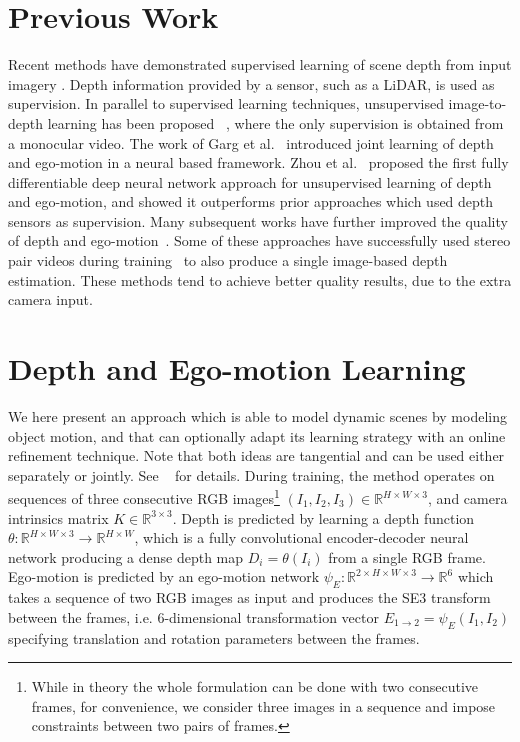 \documentclass[10pt,twocolumn,letterpaper]{article}
\begin{document}
\section{Previous Work}
Recent methods have demonstrated supervised learning of scene depth from input imagery \cite{eigen2014depth,liu2015learning,laina2016deeper,mahjourian2017geometry}. Depth information provided by a sensor, such as a LiDAR, is used as supervision.
In parallel to supervised learning techniques, unsupervised image-to-depth learning has been proposed ~\cite{zhou2017unsupervised,garg2016unsupervised,godard2017monodepth,ummenhofer2017demon,mahjourian2018unsupervised}, where the only supervision is obtained from a monocular video.
The work of Garg et al.~\cite{garg2016unsupervised} introduced joint learning of depth and ego-motion in a neural based framework. Zhou et al.~\cite{zhou2017unsupervised} proposed the first fully differentiable  deep neural network approach for unsupervised learning of depth and ego-motion, and showed it outperforms prior approaches which used depth sensors as supervision.
Many subsequent works have further improved the quality of depth and ego-motion~\cite{Yang2017unsupervised,ummenhofer2017demon,mahjourian2018unsupervised,pilzer2018unsupervised,yang2018lego,yin2018geonet,wang2018learning,Kuznietsov2017semisupervised}. Some of these approaches have successfully used stereo pair videos during training~\cite{godard2017monodepth,ummenhofer2017demon,zhan2018unsupervised,yang2018every,godard2018digging} to also produce a single image-based depth estimation. These methods tend to achieve better quality results, due to the extra camera input.

\section{Depth and Ego-motion Learning}
We here present an approach which is able to model dynamic scenes by modeling object motion, and that can optionally adapt its learning strategy with an online refinement technique. Note that both ideas are tangential and can be used either separately or jointly. See ~\cite{casser2019depth} for details. During training, the method operates on sequences of three consecutive RGB images\footnote{While in theory the whole formulation can be done with two consecutive frames, for convenience, we consider three images in a sequence and impose constraints between two pairs of frames.} $(I_1, I_2, I_3)\in \mathbb{R}^{H\times W\times 3}$, and camera intrinsics matrix $K\in \mathbb{R}^{3\times 3}$.
Depth is predicted by learning a depth function $\theta:\mathbb{R}^{H\times W\times 3}\rightarrow \mathbb{R}^{H\times W}$, which is a fully convolutional encoder-decoder neural network producing a dense depth map $D_i=\theta(I_i)$ from a single RGB frame. Ego-motion is predicted by an ego-motion network $\psi_E:\mathbb{R}^{2\times H\times W\times 3}\rightarrow \mathbb{R}^{6}$ which takes a sequence of two RGB images as input and produces the SE3 transform between the frames, i.e. 6-dimensional transformation vector $E_{1\rightarrow 2}=\psi_E(I_1, I_2)$ specifying translation and rotation parameters between the frames. 
\end{document}
